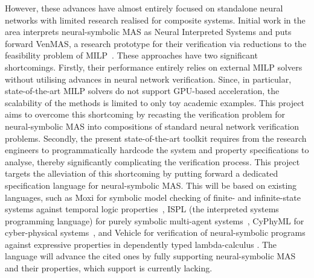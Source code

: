 \documentclass[11pt]{article}
\begin{document}
However, these advances have almost entirely focused on
standalone neural networks with limited research realised
for composite systems.  Initial work in the area interprets
neural-symbolic MAS as Neural Interpreted Systems and puts
forward {\sc VenMAS}, a research prototype for their
verification via reductions to the feasibility problem of
MILP~\cite{Akintunde+18,Akintunde+20,Akintunde+22,KouvarosBB24}.
These approaches have two significant shortcomings. Firstly,
their performance entirely relies on external MILP solvers
without utilising advances in neural network verification.
Since, in particular, state-of-the-art MILP solvers do
not support GPU-based acceleration, the scalability of the
methods is limited to only toy academic examples. This
project aims to overcome this shortcoming by recasting the
verification problem for neural-symbolic MAS into
compositions of standard neural network verification
problems. Secondly, the present state-of-the-art toolkit
requires from the research engineers  to programmatically
hardcode the system and property specifications to analyse,
thereby significantly complicating the verification process.
This project targets the alleviation of this shortcoming by
putting forward a dedicated specification language for
neural-symbolic MAS.  This will be based on existing
languages, such as Moxi for symbolic model checking of
finite- and infinite-state systems against temporal logic
properties~\cite{Rozier+2024}, ISPL (the interpreted systems
programming language) for purely symbolic multi-agent
systems~\cite{LomuscioQR17}, CyPhyML for cyber-physical
systems~\cite{Simko+13}, and Vehicle for verification of
neural-symbolic programs against expressive properties in
dependently typed lambda-calculus \cite{Daggitt+24}. The
language will advance the cited ones by fully supporting
neural-symbolic MAS and their properties, which support is
currently lacking.





\end{document}
